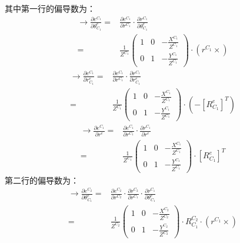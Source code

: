 \documentclass[12pt, twocolumn]{article}
\begin{document}
	其中第一行的偏导数为：
	\begin{equation*}
		\begin{aligned}
			\to\frac{\partial e^{C_1}}{\partial\theta_{C_1}^e}=&
			\frac{\partial e^{C_1}}{\partial r^{C_1}}\cdot			\frac{\partial r^{C_1}}{\partial \theta_{C_1}^e}\\=&
			\frac{1}{Z^{C_1}}\begin{pmatrix}
				1&0&-\frac{X^{C_1}}{Z^{C_1}}\\
				0&1&-\frac{Y^{C_1}}{Z^{C_1}}
			\end{pmatrix}\cdot
		(r^{C_1}\times)
		\end{aligned}
	\end{equation*}
\begin{equation*}
	\begin{aligned}
		\to\frac{\partial e^{C_1}}{\partial r_{C_1}^e}=&
		\frac{\partial e^{C_1}}{\partial r^{C_1}}\cdot			\frac{\partial r^{C_1}}{\partial r_{C_1}^e}\\=&
		\frac{1}{Z^{C_1}}\begin{pmatrix}
			1&0&-\frac{X^{C_1}}{Z^{C_1}}\\
			0&1&-\frac{Y^{C_1}}{Z^{C_1}}
		\end{pmatrix}\cdot
		(-[R_{C_1}^e]^T)
	\end{aligned}
\end{equation*}
\begin{equation*}
	\begin{aligned}
		\to\frac{\partial e^{C_1}}{\partial r^e}=&
		\frac{\partial e^{C_1}}{\partial r^{C_1}}\cdot			\frac{\partial r^{C_1}}{\partial r^e}\\=&
		\frac{1}{Z^{C_1}}\begin{pmatrix}
			1&0&-\frac{X^{C_1}}{Z^{C_1}}\\
			0&1&-\frac{Y^{C_1}}{Z^{C_1}}
		\end{pmatrix}\cdot
		[R_{C_1}^e]^T
	\end{aligned}
\end{equation*}
	第二行的偏导数为：
	\begin{equation*}
		\begin{aligned}
			\to\frac{\partial e^{C_2}}{\partial\theta_{C_1}^e}=&
			\frac{\partial e^{C_2}}{\partial r^{C_2}}\cdot	
			\frac{\partial r^{C_2}}{\partial  r^{C_1}}\cdot		\frac{\partial r^{C_1}}{\partial \theta_{C_1}^e}\\=&
			\frac{1}{Z^{C_2}}\begin{pmatrix}
				1&0&-\frac{X^{C_2}}{Z^{C_2}}\\
				0&1&-\frac{Y^{C_2}}{Z^{C_2}}
			\end{pmatrix}\cdot R_{C_1}^{C_2}\cdot
			(r^{C_1}\times)
		\end{aligned}
	\end{equation*}
\end{document}
